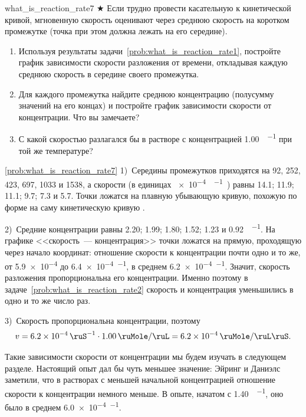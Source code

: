 \begin{problem}{}{what_is_reaction_rate7}
    $\bigstar$ Если трудно провести касательную к кинетической кривой, мгновенную скорость оценивают через среднюю скорость на коротком промежутке (точка при этом должна лежать на его середине).
    \begin{enumerate}[label=\arabic*)]
        \item Используя результаты задачи~\ref{prob:what_is_reaction_rate1}, постройте график зависимости скорости разложения  от времени, откладывая каждую среднюю скорость в середине своего промежутка.
        \item Для каждого промежутка найдите среднюю концентрацию  (полусумму значений на его концах) и постройте график зависимости скорости от концентрации. Что вы замечаете?
        \item С какой скоростью разлагался бы  в растворе с концентрацией \qty{1,00}{\ruMole\per\ruL} при той же температуре?
    \end{enumerate}
    \begin{sol}{\ref{prob:what_is_reaction_rate7}}
        1)~Середины промежутков приходятся на 92, 252, 423, 697, 1033 и \qty{1538}{\ruS}, а скорости (в единицах \qty{e-4}{\ruMole\per\ruL\ruS}) равны \num{14,1}; \num{11,9}; \num{11,1}; \num{9,7}; \num{7,3} и \num{5,7}. Точки ложатся на плавную убывающую кривую, похожую по форме на саму кинетическую кривую .

        2)~Средние концентрации равны \num{2,20}; \num{1,99}; \num{1,80}; \num{1,52}; \num{1,23} и \qty{0,92}{\ruMole\per\ruL}. На графике <<скорость~--- концентрация>> точки ложатся на прямую, проходящую через начало координат: отношение скорости к концентрации почти одно и то же, от \num{5,9e-4} до \qty{6,4e-4}{\ruS\tothe{-1}}, в среднем \qty{6,2e-4}{\ruS\tothe{-1}}. Значит, скорость разложения  пропорциональна его концентрации. Именно поэтому в задаче~\ref{prob:what_is_reaction_rate2} скорость и концентрация уменьшились в одно и то же число раз.

        3)~Скорость пропорциональна концентрации, поэтому
        \begin{equation*}
            v = \qty{6,2e-4}{\ruS\tothe{-1}} \cdot \qty{1,00}{\ruMole\per\ruL} = \qty{6,2e-4}{\ruMole\per\ruL\ruS}.
        \end{equation*}

        Такие зависимости скорости от концентрации мы будем изучать в следующем разделе. Настоящий опыт дал бы чуть меньшее значение: Эйринг и Даниэлс заметили, что в растворах с меньшей начальной концентрацией отношение скорости к концентрации немного меньше. В опыте, начатом с \qty{1,40}{\ruMole\per\ruL}, оно было в среднем \qty{6,0e-4}{\ruS\tothe{-1}}.
    \end{sol}
\end{problem}

